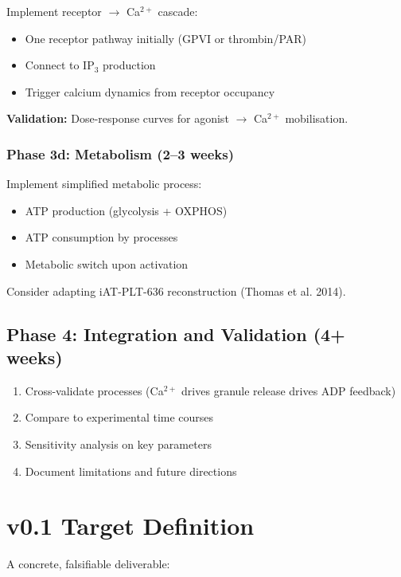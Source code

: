 \documentclass[11pt,a4paper]{report}
\begin{document}
Implement receptor $\to$ Ca$^{2+}$ cascade:

\begin{itemize}
    \item One receptor pathway initially (GPVI or thrombin/PAR)
    \item Connect to IP$_3$ production
    \item Trigger calcium dynamics from receptor occupancy
\end{itemize}

\textbf{Validation:} Dose-response curves for agonist $\to$ Ca$^{2+}$ mobilisation.

\subsubsection{Phase 3d: Metabolism (2--3 weeks)}

Implement simplified metabolic process:

\begin{itemize}
    \item ATP production (glycolysis + OXPHOS)
    \item ATP consumption by processes
    \item Metabolic switch upon activation
\end{itemize}

Consider adapting iAT-PLT-636 reconstruction (Thomas et al. 2014).

\subsection{Phase 4: Integration and Validation (4+ weeks)}

\begin{enumerate}
    \item Cross-validate processes (Ca$^{2+}$ drives granule release drives ADP feedback)
    \item Compare to experimental time courses
    \item Sensitivity analysis on key parameters
    \item Document limitations and future directions
\end{enumerate}

\section{v0.1 Target Definition}

A concrete, falsifiable deliverable:
\end{document}
